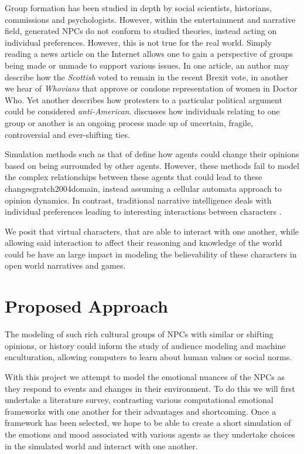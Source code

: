 \documentclass[letterpaper]{article}
\begin{document}
Group formation has been studied in depth by social scientists, historians, commissions and psychologists. However, within the entertainment and narrative field, generated NPCs do not conform to studied theories, instead acting on individual preferences. However, this is not true for the real world. Simply reading a news article on the Internet allows one to gain a perspective of groups being made or unmade to support various issues. In one article, an author may describe how the \textit{Scottish} voted to remain in the recent Brexit vote\cite{brooks2016scottish}, in another we hear of \textit{Whovians} that approve or condone representation of women in Doctor Who\cite{jowett2014girls}. Yet another describes how protesters to a particular political argument could be considered \textit{anti-American}. \citeauthor{latour2005reassembling} discusses how individuals relating to one group or another is an ongoing process made up of uncertain, fragile, controversial and ever-shifting ties\cite{latour2005reassembling}. 

Simulation methods such as that of \citeauthor{wang2014modeling} define how agents could change their opinions based on being surrounded by other agents. However, these methods fail to model the complex relationships between these agents that could lead to these changes{gratch2004domain}, instead assuming a cellular automata approach to opinion dynamics\cite{wang2014modeling,hegselmann2002opinion}. In contrast, traditional narrative intelligence deals with individual preferences leading to interesting interactions between characters \cite{riedl2006believable}.

We posit that virtual characters, that are able to interact with one another, while allowing said interaction to affect their reasoning and knowledge of the world could be have an large impact in modeling the believability of these characters in open world narratives and games.

\section{Proposed Approach} 

The modeling of such rich cultural groups of NPCs with similar or shifting opinions, or history could inform the study of audience modeling and machine enculturation, allowing computers to learn about human values or social norms. 

With this project we attempt to model the emotional nuances of the NPCs as they respond to events and changes in their environment. To do this we will first undertake a literature survey, contrasting various computational emotional frameworks with one another for their advantages and shortcoming. Once a framework has been selected, we hope to be able to create a short simulation of the emotions and mood associated with various agents as they undertake choices in the simulated world and interact with one another. 
\end{document}
